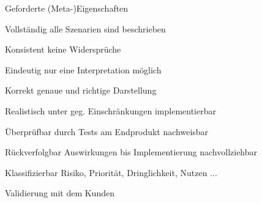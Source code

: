 \documentclass[a4paper]{article}
\begin{document}
\begin{multicols}{3}

  Geforderte (Meta-)Eigenschaften
  \begin{description*}
    \item[Vollständig] alle Szenarien sind beschrieben
    \item[Konsistent] keine Widersprüche
    \item[Eindeutig] nur eine Interpretation möglich
    \item[Korrekt] genaue und richtige Darstellung
    \item[Realistisch] unter geg. Einschränkungen implementierbar
    \item[Überprüfbar] durch Tests am Endprodukt nachweisbar
    \item[Rückverfolgbar] Auswirkungen bis Implementierung nachvollziehbar
    \item[Klassifizierbar] Risiko, Priorität, Dringlichkeit, Nutzen ...
    \item[Validierung] mit dem Kunden
  \end{description*}



\end{multicols}
\end{document}
